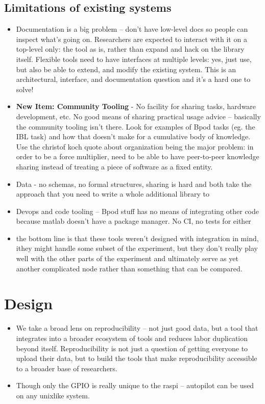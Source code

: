 \subsection{Limitations of existing systems}

\begin{itemize}
\item Documentation is a big problem -- don't have low-level docs so people can inspect what's going on. Researchers are expected to interact with it on a top-level only: the tool as is, rather than expand and hack on the library itself. Flexible tools need to have interfaces at multiple levels: yes, just use, but also be able to extend, and modify the existing system. This is an architectural, interface, and documentation question and it's a hard one to solve!
\item \textbf{New Item: Community Tooling} - No facility for sharing tasks, hardware development, etc. No good means of sharing practical usage advice -- basically the community tooling isn't there. Look for examples of Bpod tasks (eg. the IBL task) and how that doesn't make for a cumulative body of knowledge. Use the christof koch quote about organization being the major problem: in order to be a force multiplier, need to be able to have peer-to-peer knowledge sharing instead of treating a piece of software as a fixed entity.
\item Data - no schemas, no formal structures, sharing is hard and both take the approach that you need to write a whole additional library to 
\item Devops and code tooling -- Bpod stuff has no means of integrating other code because matlab doesn't have a package manager. No CI, no tests for either 
\item the bottom line is that these tools weren't designed with integration in mind, ithey might handle some subset of the experiment, but they don't really play well with the other parts of the experiment and ultimately serve as yet another complicated node rather than something that can be compared. 
\end{itemize}


\section{Design}

\begin{itemize}
\item We take a broad lens on reproducibility -- not just good data, but a tool that integrates into a broader ecosystem of tools and reduces labor duplication beyond itself. Reproducibility is not just a question of getting everyone to upload their data, but to build the tools that make reproducibility accessible to a broader base of researchers.	
\item Though only the GPIO is really unique to the raspi -- autopilot can be used on any unixlike system.
\end{itemize}

